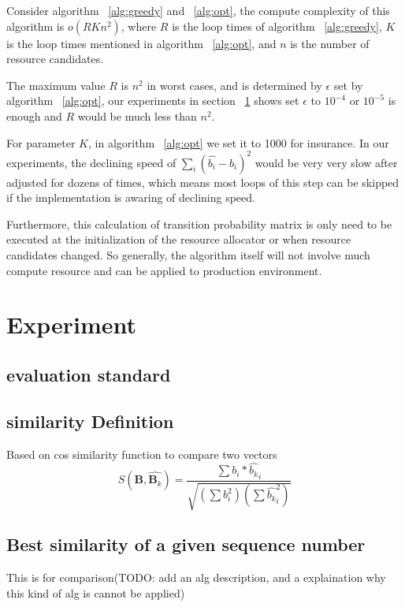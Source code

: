 \documentclass[11pt,a4paper]{article}
\begin{document}
Consider algorithm ~\ref{alg:greedy} and ~\ref{alg:opt}, the compute complexity of this
algorithm is $o(RKn^2)$, where $R$ is the loop times of algorithm ~\ref{alg:greedy}, $K$ is
the loop times mentioned in algorithm ~\ref{alg:opt}, and $n$ is the number of resource candidates.

The maximum value $R$ is $n^{2}$ in worst cases, and is determined by $\epsilon$ set by
algorithm ~\ref{alg:opt}, our experiments in section ~\ref{sec:exp} shows
set $\epsilon$ to $10^{-4}$ or $10^{-5}$ is enough and $R$ would be
much less than $n^{2}$.

For parameter $K$, in algorithm ~\ref{alg:opt} we set it to 1000 for insurance. 
In our experiments, the declining speed of $\sum_i {(\hat{b_i}-b_i)^2}$ would be very very slow after
adjusted for dozens of times, which means most loops of this step can be skipped 
if the implementation is awaring of declining speed.

Furthermore, this calculation of transition probability matrix is only need to be executed at the initialization of 
the resource allocator or when resource candidates changed.
So generally, the algorithm itself will not involve much compute resource and can be applied
to production environment.

\section{\textbf\normalsize{Experiment}}
\label{sec:exp}
\subsection{\textbf evaluation standard}
\subsection{\textbf {similarity Definition}}
Based on cos similarity function to compare two vectors
\begin{equation}
S(\mathbf{B}, \hat{\mathbf{B}_k}) = \frac{\sum{b_{i} * \hat{b_k}_{i}}} {\sqrt{(\sum{b_{i}^2})(\sum{\hat{b_k}_i^2})}}
\end{equation}

\subsection{\textbf {Best similarity of a given sequence number}}
This is for comparison(TODO: add an alg description, and a explaination why this kind of alg is cannot be applied)
\end{document}
